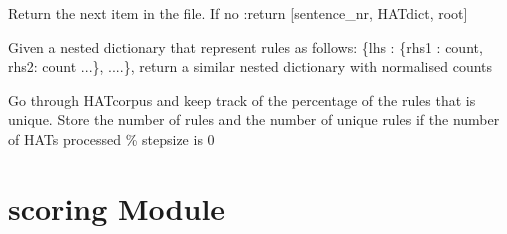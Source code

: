\documentclass[letterpaper,10pt,english]{sphinxmanual}
\begin{document}
\begin{fulllineitems}
\begin{fulllineitems}
\end{fulllineitems}


\begin{fulllineitems}
\label{process_hats:process_hats.ProcessHATs.next}
Return the next item in the file. If no 
:return {[}sentence\_nr, HATdict, root{]}

\end{fulllineitems}


\begin{fulllineitems}
\label{process_hats:process_hats.ProcessHATs.normalise}
Given a nested dictionary that represent rules as follows:
\{lhs : \{rhs1 : count, rhs2: count ...\}, ....\}, return a
similar nested dictionary with normalised counts

\end{fulllineitems}


\begin{fulllineitems}
\label{process_hats:process_hats.ProcessHATs.unique_rules}
Go through HATcorpus and keep track of the
percentage of the rules that is unique.
Store the number of rules and the number of unique
rules if the number of HATs processed \% stepsize is 0

\end{fulllineitems}


\end{fulllineitems}



\chapter{scoring Module}
\label{scoring:module-scoring}\label{scoring::doc}\label{scoring:scoring-module}
\end{document}
